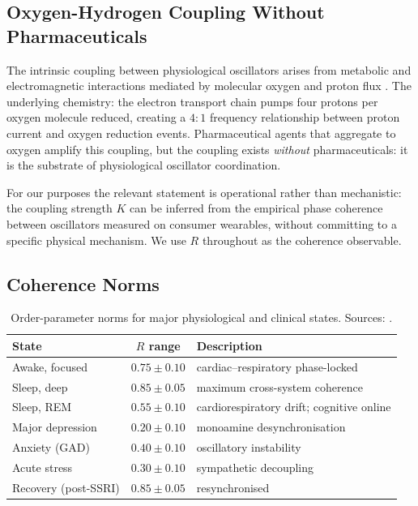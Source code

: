 \documentclass[11pt,twocolumn,a4paper]{article}
\theoremstyle{definition}
\theoremstyle{remark}
\newcommand{\Rcoh}{R}
\newcommand{\Korder}{K}
\begin{document}
\subsection{Oxygen-Hydrogen Coupling Without Pharmaceuticals}

The intrinsic coupling between physiological oscillators arises from
metabolic and electromagnetic interactions mediated by molecular
oxygen and proton flux \citep{wallace2013, halestrap2013}. The
underlying chemistry: the electron transport chain pumps four
protons per oxygen molecule reduced, creating a $4{:}1$ frequency
relationship between proton current and oxygen reduction events.
Pharmaceutical agents that aggregate to oxygen amplify this
coupling, but the coupling exists \emph{without} pharmaceuticals:
it is the substrate of physiological oscillator coordination.

For our purposes the relevant statement is operational rather than
mechanistic: the coupling strength $\Korder$ can be inferred from
the empirical phase coherence between oscillators measured on
consumer wearables, without committing to a specific physical
mechanism. We use $\Rcoh$ throughout as the coherence observable.

\subsection{Coherence Norms}

\begin{table}[H]
\centering
\small
\begin{tabular}{lcl}
\toprule
\textbf{State} & $\Rcoh$ range & \textbf{Description} \\
\midrule
Awake, focused & $0.75 \pm 0.10$ & cardiac--respiratory phase-locked \\
Sleep, deep & $0.85 \pm 0.05$ & maximum cross-system coherence \\
Sleep, REM & $0.55 \pm 0.10$ & cardiorespiratory drift; cognitive online \\
Major depression & $0.20 \pm 0.10$ & monoamine desynchronisation \\
Anxiety (GAD) & $0.40 \pm 0.10$ & oscillatory instability \\
Acute stress & $0.30 \pm 0.10$ & sympathetic decoupling \\
Recovery (post-SSRI) & $0.85 \pm 0.05$ & resynchronised \\
\bottomrule
\end{tabular}
\caption{Order-parameter norms for major physiological and clinical
states. Sources: \citet{strogatz2000, acebron2005, glass2001,
schiff2009}.}
\label{tab:R-norms}
\end{table}
\end{document}
